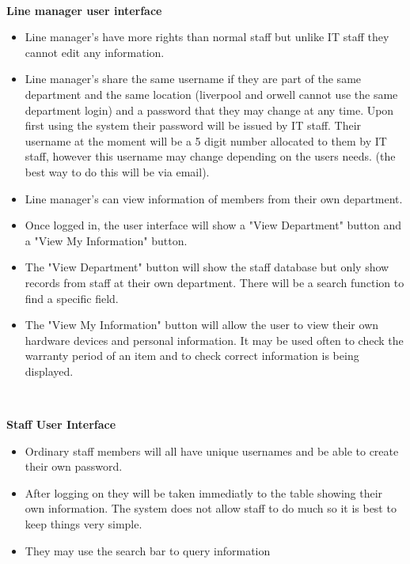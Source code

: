 \

\textbf{Line manager user interface}

\begin{itemize}
\item Line manager's have more rights than normal staff but unlike IT staff they cannot edit any information.
\item Line manager's share the same username if they are part of the same department and the same location (liverpool and orwell cannot use the same department login) and a password that they may change at any time. Upon first using the system their password will be issued by IT staff. Their username at the moment will be a 5 digit number allocated to them by IT staff, however this username may change depending on the users needs. (the best way to do this will be via email). 
\item Line manager's can view information of members from their own department.
\item Once logged in, the user interface will show a "View Department" button and a "View My Information" button.
\item The "View Department" button will show the staff database but only show records from staff at their own department. There will be a search function to find a specific field.
\item The "View My Information" button will allow the user to view their own hardware devices and personal information. It may be used often to check the warranty period of an item and to check correct information is being displayed.
\end{itemize}

\

\textbf{Staff User Interface}
\begin{itemize}
\item Ordinary staff members will all have unique usernames and be able to create their own password.
\item After logging on they will be taken immediatly to the table showing their own information. The system does not allow staff to do much so it is best to keep things very simple.
\item  They may use the search bar to query information
\end{itemize}

\

